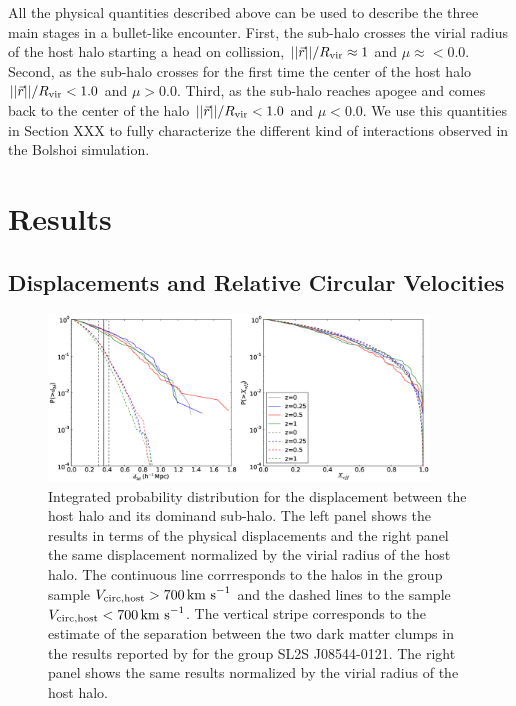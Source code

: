 \documentclass{emulateapj}
\newcommand{\kms}{{\ifmmode{{\mathrm{\,km\ s}^{-1}}}\else{\,km~s$^{-1}$}\fi}}
\begin{document}
All the physical quantities described above can be used to describe
the three main stages in a bullet-like encounter. First, the sub-halo
crosses the virial radius of the host halo starting a head on
collission, $||\vec{r}||/R_{\rm vir}\approx 1$ and
$\mu\approx<0.0$. Second, as the sub-halo crosses for the first time
the center of the host halo $||\vec{r}||/R_{\rm vir} < 1.0$ and
$\mu>0.0$. Third, as the sub-halo reaches apogee and comes back to the
center of the halo $||\vec{r}||/R_{\rm vir} < 1.0$ and $\mu<0.0$. We use
this quantities in Section XXX to fully characterize the different
kind of interactions observed in the Bolshoi simulation. 



\section{Results}
\label{sec:results}

\subsection{Displacements and Relative Circular Velocities}
\label{fig:displacement}

\begin{figure}
\begin{center}
\includegraphics[width=0.9\textwidth]{Figures_eps/figure_2.eps}
\end{center}
\caption{
  Integrated probability distribution for the displacement
  between the host halo and its dominand sub-halo. The left panel
  shows the results in terms of the physical displacements and the
  right panel the same displacement normalized by the virial radius of
  the host halo. The continuous line corrresponds to the halos in the
  group sample $V_{\rm circ,host}>700\kms$ and the dashed lines to the
  sample $V_{\rm circ,host}<700\kms$.
  The vertical stripe corresponds to the estimate of the separation
  between the two dark matter clumps in the results reported by
  \citet{Gastaldello} for the group SL2S J08544-0121. The right panel
  shows the same results normalized by the virial radius of the host
  halo.} 
\label{fig:displacement}
\end{figure}
\end{document}
